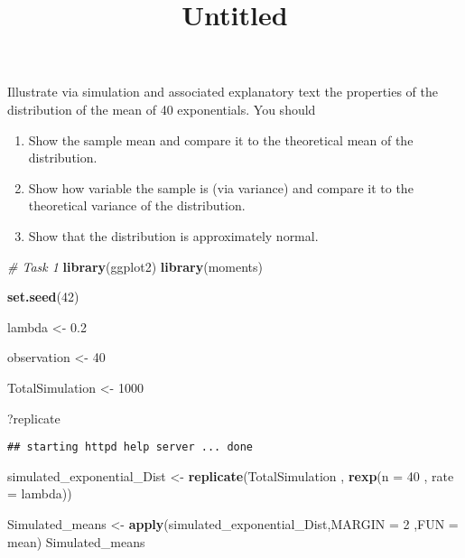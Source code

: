\documentclass[
]{article}
\title{Untitled}
\author{}
\date{\vspace{-2.5em}}
\newenvironment{Shaded}{\begin{snugshade}}{\end{snugshade}}
\newcommand{\CommentTok}[1]{\textcolor[rgb]{0.56,0.35,0.01}{\textit{#1}}}
\newcommand{\DataTypeTok}[1]{\textcolor[rgb]{0.13,0.29,0.53}{#1}}
\newcommand{\DecValTok}[1]{\textcolor[rgb]{0.00,0.00,0.81}{#1}}
\newcommand{\FloatTok}[1]{\textcolor[rgb]{0.00,0.00,0.81}{#1}}
\newcommand{\KeywordTok}[1]{\textcolor[rgb]{0.13,0.29,0.53}{\textbf{#1}}}
\newcommand{\NormalTok}[1]{#1}
\newcommand{\StringTok}[1]{\textcolor[rgb]{0.31,0.60,0.02}{#1}}
\begin{document}
\maketitle

Illustrate via simulation and associated explanatory text the properties
of the distribution of the mean of 40 exponentials. You should

\begin{enumerate}
\def\labelenumi{\arabic{enumi}.}
\item
  Show the sample mean and compare it to the theoretical mean of the
  distribution.
\item
  Show how variable the sample is (via variance) and compare it to the
  theoretical variance of the distribution.
\item
  Show that the distribution is approximately normal.
\end{enumerate}

\begin{Shaded}
\begin{Highlighting}[]
\CommentTok{\# Task 1}
\KeywordTok{library}\NormalTok{(ggplot2)}
\KeywordTok{library}\NormalTok{(moments)}

\KeywordTok{set.seed}\NormalTok{(}\DecValTok{42}\NormalTok{)}

\NormalTok{lambda \textless{}{-}}\StringTok{ }\FloatTok{0.2}

\NormalTok{observation \textless{}{-}}\StringTok{ }\DecValTok{40}

\NormalTok{TotalSimulation \textless{}{-}}\StringTok{ }\DecValTok{1000}


\NormalTok{?replicate}
\end{Highlighting}
\end{Shaded}

\begin{verbatim}
## starting httpd help server ... done
\end{verbatim}

\begin{Shaded}
\begin{Highlighting}[]
\NormalTok{simulated\_exponential\_Dist \textless{}{-}}\StringTok{ }\KeywordTok{replicate}\NormalTok{(TotalSimulation , }\KeywordTok{rexp}\NormalTok{(}\DataTypeTok{n =} \DecValTok{40}\NormalTok{ , }\DataTypeTok{rate =}\NormalTok{ lambda))}

\NormalTok{Simulated\_means \textless{}{-}}\StringTok{ }\KeywordTok{apply}\NormalTok{(simulated\_exponential\_Dist,}\DataTypeTok{MARGIN =} \DecValTok{2}\NormalTok{ ,}\DataTypeTok{FUN =}\NormalTok{ mean)}
\NormalTok{Simulated\_means}
\end{Highlighting}
\end{Shaded}
\end{document}
